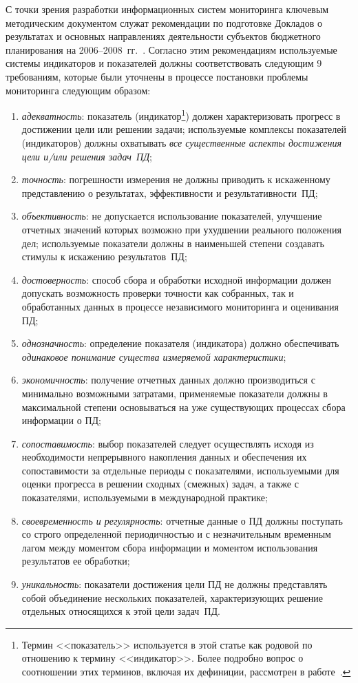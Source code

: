 \begin{multicols}{2}
    С точки зрения разработки информационных систем мониторинга ключевым методическим 
документом служат рекомендации по подготовке Докладов о результатах и основных 
направлениях деятельности субъектов бюджетного планирования на 
    2006--2008~гг.~\cite{24-zat}. Согласно этим рекомендациям используемые системы 
индикаторов и показателей должны соответствовать следующим 9 требованиям, которые были 
уточнены в процессе постановки проблемы мониторинга следующим образом:
    \begin{enumerate}[(1)]
\item \textit{адекватность}: показатель (индикатор\footnote{Термин <<показатель>> 
используется в этой статье как родовой по отношению к термину <<индикатор>>. Более подробно 
вопрос о соотношении этих терминов, включая их дефиниции, рассмотрен в работе~\cite{10-zat}.}) 
должен характеризовать прогресс в достижении цели или решении задачи; используемые 
комплексы показателей (индикаторов) должны охватывать \textit{все существенные аспекты 
достижения цели и/или решения задач~ПД};
\item \textit{точность}: погрешности измерения не должны приводить к искаженному 
представлению о результатах, эффективности и результа\-тив\-ности~ПД;
\item \textit{объективность}: не допускается использование показателей, улучшение 
отчетных значений которых возможно при ухудшении реального положения дел; 
используемые показатели должны в наименьшей степени создавать стимулы к искажению 
результатов~ПД;
\item \textit{достоверность}: способ сбора и обработки исходной информации должен 
допускать возможность проверки точности как собранных, так и обработанных данных в 
процессе независимого мониторинга и оценивания ПД;
\item \textit{однозначность}: определение показателя (индикатора) должно обеспечивать 
\textit{одинаковое понимание существа измеряемой характеристики};
\item \textit{экономичность}: получение отчетных данных должно производиться с 
минимально возможными затратами, применяемые показатели должны в максимальной 
степени основываться на уже существующих процессах сбора информации о ПД;
\item \textit{сопоставимость}: выбор показателей следует осуществлять исходя из 
необходимости непрерывного накопления данных и обеспечения их сопоставимости за 
отдельные периоды с показателями, используемыми для оценки прогресса в решении 
сходных (смежных) задач, а также с показателями, используемыми в международной 
практике;
\item \textit{своевременность и регулярность}: отчетные данные о ПД должны поступать со 
строго определенной периодичностью и с незначительным временным лагом между 
моментом сбора информации и моментом использования результатов ее обработки;
\item \textit{уникальность}: показатели достижения цели ПД не должны представлять собой 
объединение нескольких показателей, характеризующих решение отдельных относящихся к 
этой цели задач~ПД.
\end{enumerate}


\end{multicols}
